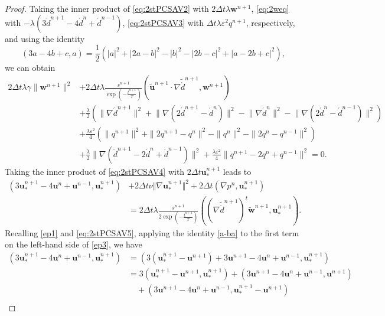 \documentclass[10pt,a4paper]{amsart}
\newcommand{\dd}{\ensuremath{\acute d}}
\newcommand{\uu}{\mathrm{\textbf{u}}}
\newcommand{\ww}{\mathrm{\textbf{w}}}
\begin{document}
\begin{proof}
Taking the inner product of \eqref{eq:2stPCSAV2} with $2\Delta t\lambda\ww^{n+1}$, \eqref{eq:2weq} with $-\lambda\left(3\dd^{n+1}-4\dd^{n}+\dd^{n-1}\right)$, \eqref{eq:2stPCSAV3} with $\Delta t\lambda\varepsilon^2q^{n+1}$, respectively, and using the identity 
\begin{equation}\label{ep1}
(3a-4b+c,a)=\frac{1}{2}\left(|a|^2+|2a-b|^2-|b|^2-|2b-c|^2+|a-2b+c|^2\right),
\end{equation}
we can obtain
{\small \begin{align}\label{ep2}%
2\Delta t\lambda\gamma\|\ww^{n+1}\|^2&+2\Delta t\lambda\frac{s^{n+1}}{\exp\left(-\frac{t^{n+1}}{T}\right)}\left(\tilde{\uu}^{n+1}\cdot\nabla \tilde{\dd}^{n+1},\ww^{n+1}\right)\\
&+\frac{\lambda}{2}\left(\lVert\nabla\dd^{n+1}\rVert^2+\lVert\nabla\left(2\dd^{n+1}-\dd^n\right)\rVert^2-\lVert\nabla\dd^{n}\rVert^2-\lVert\nabla\left(2\dd^{n}-\dd^{n-1}\right)\rVert^2
\right)\nonumber\\
&+\frac{\lambda\varepsilon^2}{4}\left(\|q^{n+1}\|^2+\|2q^{n+1}-q^n\|^2-\|q^{n}\|^2-\|2q^n-q^{n-1}\|^2\right)\nonumber\\
&+\frac{\lambda}{2}\lVert\nabla\left(\dd^{n+1}-2\dd^n+\dd^{n-1}\right)\rVert^2+\frac{\lambda\varepsilon^2}{4}\|q^{n+1}-2q^n+q^{n-1}\|^2=0.\nonumber
\end{align}}
Taking the inner product of \eqref{eq:2stPCSAV4} with $2\Delta t\uu_*^{n+1}$ leads to
\begin{align}\label{ep3}%
\left(3\uu_*^{n+1}-4\uu^{n}+\uu^{n-1},\uu_*^{n+1}\right)&+2\Delta t\nu\Vert \nabla\uu_*^{n+1}\Vert^2+2\Delta t\left(\nabla p^n,\uu_*^{n+1}\right)\\
&= 2\Delta t\lambda\frac{s^{n+1}}{2\exp\left(-\frac{t^{n+1}}{T}\right)}\left(\left(\nabla\tilde{\dd}^{n+1}\right)^t\tilde{\ww}^{n+1},\uu_*^{n+1}\right).\nonumber
\end{align}
Recalling \eqref{ep1} and \eqref{eq:2stPCSAV5}, applying the identity \eqref{a-ba} to the first term on the left-hand side of \eqref{ep3}, we have
{\begin{align}\label{ep32}
\left(3\uu_*^{n+1}-4\uu^{n}+\uu^{n-1},\uu_*^{n+1}\right)&=\left(3\left(\uu_*^{n+1}-\uu^{n+1}\right)+3\uu^{n+1}-4\uu^{n}+\uu^{n-1},\uu_*^{n+1}\right)\nonumber\\
&=3\left(\uu_*^{n+1}-\uu^{n+1},\uu_*^{n+1}\right)+
\left(3\uu^{n+1}-4\uu^{n}+\uu^{n-1},\uu^{n+1}\right)\nonumber\\
&\quad+\left(3\uu^{n+1}-4\uu^{n}+\uu^{n-1},\uu_*^{n+1}-\uu^{n+1}\right)\nonumber\\

\end{align}}
\end{proof}
\end{document}
